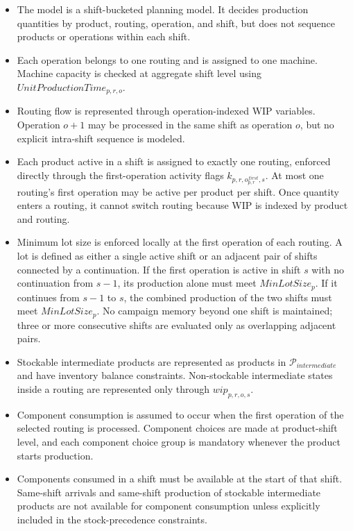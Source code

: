 \documentclass{article}
\begin{document}
\begin{itemize}

\item The model is a shift-bucketed planning model. It decides production quantities by product, routing, operation, and shift, but does not sequence products or operations within each shift.

\item Each operation belongs to one routing and is assigned to one machine. Machine capacity is checked at aggregate shift level using $UnitProductionTime_{p,r,o}$.

\item Routing flow is represented through operation-indexed WIP variables. Operation $o+1$ may be processed in the same shift as operation $o$, but no explicit intra-shift sequence is modeled.

\item Each product active in a shift is assigned to exactly one routing, enforced directly through the first-operation activity flags $k_{p,r,o^{first}_{p,r},s}$. At most one routing's first operation may be active per product per shift. Once quantity enters a routing, it cannot switch routing because WIP is indexed by product and routing.

\item Minimum lot size is enforced locally at the first operation of each routing. A lot is defined as either a single active shift or an adjacent pair of shifts connected by a continuation. If the first operation is active in shift $s$ with no continuation from $s-1$, its production alone must meet $MinLotSize_p$. If it continues from $s-1$ to $s$, the combined production of the two shifts must meet $MinLotSize_p$. No campaign memory beyond one shift is maintained; three or more consecutive shifts are evaluated only as overlapping adjacent pairs.

\item Stockable intermediate products are represented as products in $\mathcal{P}_{intermediate}$ and have inventory balance constraints. Non-stockable intermediate states inside a routing are represented only through $wip_{p,r,o,s}$.

\item Component consumption is assumed to occur when the first operation of the selected routing is processed. Component choices are made at product-shift level, and each component choice group is mandatory whenever the product starts production.

\item Components consumed in a shift must be available at the start of that shift. Same-shift arrivals and same-shift production of stockable intermediate products are not available for component consumption unless explicitly included in the stock-precedence constraints.


\end{itemize}
\end{document}
